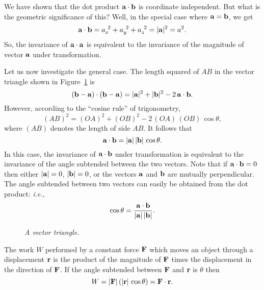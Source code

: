 We have shown that the dot product ${\bf a} \cdot {\bf b}$ is coordinate independent.
But what is the geometric significance of this? Well, in the special case
where ${\bf a} = {\bf b}$, we get
\begin{equation}
{\bf a} \cdot {\bf b} = a_x^{~2}+a_y^{~2} + a_z^{~2} = |{\bf a}|^2=a^2.
\end{equation}
So, the invariance of ${\bf a} \cdot {\bf a}$ is equivalent to the invariance 
of the magnitude of  vector ${\bf a}$ under transformation. 

Let us now investigate the general case. The length squared of $AB$ in the
vector triangle shown in Figure~\ref{f5} is
\begin{equation}
({\bf b} - {\bf a} ) \cdot ({\bf b} - {\bf a} ) = |{\bf a}|^2 + |{\bf b}|^2 - 2\,{\bf a} \cdot
{\bf b}.
\end{equation}
However, according to the ``cosine rule'' of trigonometry,
\begin{equation}
(AB)^2 = (OA)^2 + (OB)^2 - 2 \,(OA)\,(OB)\,\cos\theta,
\end{equation}
where $(AB)$ denotes the length of side $AB$. It follows that
\begin{equation}
{\bf a} \cdot {\bf b} = |{\bf a}|\, |{\bf b}|\, \cos\theta.
\end{equation}
In this case, the invariance of ${\bf a} \cdot {\bf b}$ under transformation is equivalent
to the invariance of the angle subtended between the two vectors. Note that
if ${\bf a} \cdot {\bf b} =0$ then either $|{\bf a}|=0$, $|{\bf b}|=0$, or the vectors
$\bf a$ and $\bf b$ are mutually perpendicular. The angle subtended between two vectors
can easily be obtained from the dot product: {\em i.e.}, 
\begin{equation}
\cos\theta = \frac{{\bf a} \cdot {\bf b}}{|{\bf a}| \,|{\bf b}| }.
\end{equation}

\begin{figure}
\epsfysize=1.5in
\centerline{}
\caption{\em A vector triangle.}\label{f5}
\end{figure}

The work $W$ performed by a constant force $\bf F$ which moves an object through a displacement $\bf r$
is the product of the magnitude of $\bf F$ times the displacement in the direction
of $\bf F$. If the angle subtended between  $\bf F$ and $\bf r$ is $\theta$ then
\begin{equation}
W = |{\bf F}| \,(|{\bf r}|\,\cos\theta) = {\bf F}\cdot {\bf r}.
\end{equation}

